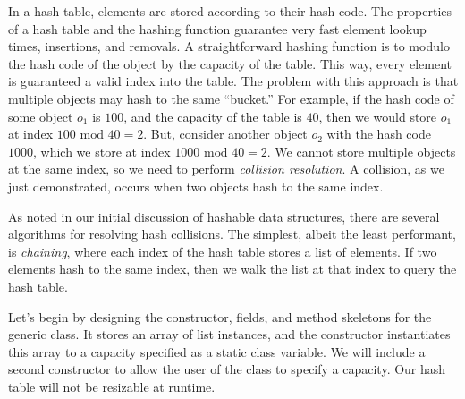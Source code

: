 In a hash table, elements are stored according to their hash code. The properties of a hash table and the hashing function guarantee very fast element lookup times, insertions, and removals. A straightforward hashing function is to modulo the hash code of the object by the capacity of the table. This way, every element is guaranteed a valid index into the table. The problem with this approach is that multiple objects may hash to the same ``bucket.'' For example, if the hash code of some object $o_1$ is $100$, and the capacity of the table is $40$, then we would store $o_1$ at index $100 \text{ mod } 40 = 2$. But, consider another object $o_2$ with the hash code $1000$, which we store at index $1000 \text{ mod } 40 = 2$. We cannot store multiple objects at the same index, so we need to perform \emph{collision resolution}. A collision, as we just demonstrated, occurs when two objects hash to the same index. 

As noted in our initial discussion of hashable data structures, there are several algorithms for resolving hash collisions. The simplest, albeit the least performant, is \emph{chaining}, where each index of the hash table stores a list of elements. If two elements hash to the same index, then we walk the list at that index to query the hash table. 

Let's begin by designing the constructor, fields, and method skeletons for the generic  class. It stores an array of list instances, and the constructor instantiates this array to a capacity specified as a static class variable. We will include a second constructor to allow the user of the class to specify a capacity. Our hash table will not be resizable at runtime.

